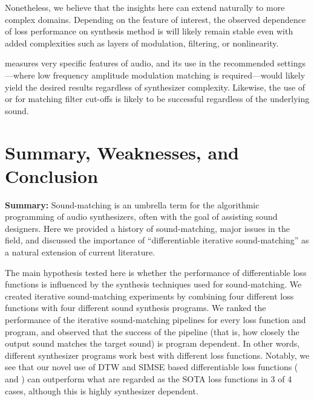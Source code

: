 Nonetheless, we believe that the insights here can extend naturally to more complex domains. Depending on the feature of interest, the observed dependence of loss performance on synthesis method is will likely remain stable even with added complexities such as layers of modulation, filtering, or nonlinearity. 

\DTWEnv{} measures very specific features of audio, and its use in the recommended settings---where low frequency amplitude modulation matching is required---would likely yield the desired results regardless of synthesizer complexity. Likewise, the use of \SIMSESpec{} or \LoneSpec{} for matching filter cut-offs is likely to be successful regardless of the underlying sound. 





\section{Summary, Weaknesses, and Conclusion}
\label{sec:summary_conclusion}
\textbf{Summary:} Sound-matching is an umbrella term for the algorithmic programming of audio synthesizers, often with the goal of assisting sound designers. Here we provided a history of sound-matching, major issues in the field, and discussed the importance of ``differentiable iterative sound-matching'' as a natural extension of current literature.

The main hypothesis tested here is whether the performance of differentiable loss functions is influenced by the synthesis techniques used for sound-matching. We created iterative sound-matching experiments by combining four different loss functions with four different sound synthesis programs. We ranked the performance of the iterative sound-matching pipelines for every loss function and program, and observed that the success of the pipeline (that is, how closely the output sound matches the target sound) is program dependent. In other words, different synthesizer programs work best with different loss functions. Notably, we see that our novel use of DTW and SIMSE based differentiable loss functions (\DTWEnv{} and \SIMSESpec) can outperform what are regarded as the SOTA loss functions in 3 of 4 cases, although this is highly synthesizer dependent. 



